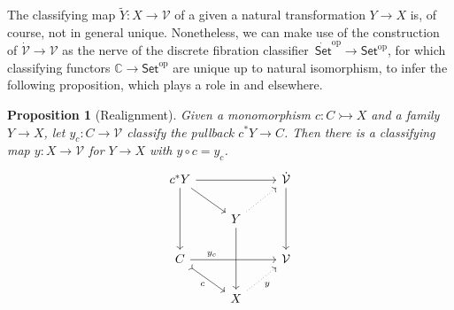 \documentclass[11pt]{article}
\newcommand{\C}{\ensuremath{\mathbb{C}}}
\newcommand{\op}[1]{\ensuremath{{#1}^{\mathrm{op}}}}
\newcommand{\Set}{\ensuremath{\mathsf{Set}}}
\newcommand{\cof}{\ensuremath{\rightarrowtail}}
\renewcommand{\to}{\ensuremath{\rightarrow}}
\newcommand{\SSet}{\ensuremath{\,\dot{\Set}}}
\newcommand{\V}{\ensuremath{\mathcal{V}}}
\newcommand{\VV}{\ensuremath{\dot{\mathcal{V}}}}
\newtheorem{proposition}[theorem]{Proposition}
\theoremstyle{remark}
\theoremstyle{definition}
\begin{document}
The classifying map $\tilde{Y} : X\to \V$ of a given a natural transformation $Y\to X$ is, of course, not in general unique. Nonetheless, we can make use of the construction of $\VV\to\V$ as the nerve of the discrete fibration classifier $\op\SSet\to\op\Set$, for which classifying functors $\C \to \op\Set$ are unique up to natural isomorphism, to infer the following proposition, which plays a role in \cite{Shu:15,GSS:22} and elsewhere.

\begin{proposition}[Realignment]\label{prop:realignment}
Given a monomorphism $c : C\cof X$ and a family $Y\to X$, let $y_c : C \to \V$ classify the pullback $c^*Y\to C$.  Then there is a classifying map $y: X \to \V$ for $Y\to X$ with $y\circ c = y_c$.
%
\begin{equation}\label{diagram:realignment}
\begin{tikzcd}
c^*Y \ar[dd] \ar[rd] \ar[rr] && \VV \ar[dd] \\
& Y \ar[dd] \ar[ru, dotted] & \\
C  \ar[rd, tail,swap, "c"] \ar[rr, near start, "y_c"] && \V  \\
& X \ar[ru, dotted, swap, "y"] &
\end{tikzcd}
\end{equation}
\end{proposition}
%
\end{document}
